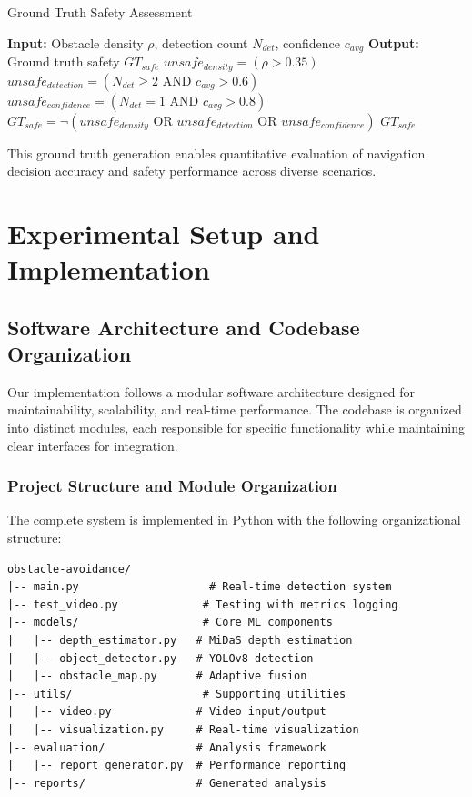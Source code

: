 \documentclass[12pt,oneside]{book}
\begin{document}
\begin{algorithm}
\caption{Ground Truth Safety Assessment}
\begin{algorithmic}
\STATE \textbf{Input:} Obstacle density $\rho$, detection count $N_{det}$, confidence $c_{avg}$
\STATE \textbf{Output:} Ground truth safety $GT_{safe}$
\STATE $unsafe_{density} = (\rho > 0.35)$
\STATE $unsafe_{detection} = (N_{det} \geq 2 \text{ AND } c_{avg} > 0.6)$
\STATE $unsafe_{confidence} = (N_{det} = 1 \text{ AND } c_{avg} > 0.8)$
\STATE $GT_{safe} = \neg(unsafe_{density} \text{ OR } unsafe_{detection} \text{ OR } unsafe_{confidence})$
\RETURN $GT_{safe}$
\end{algorithmic}
\end{algorithm}

This ground truth generation enables quantitative evaluation of navigation decision accuracy and safety performance across diverse scenarios.

\section{Experimental Setup and Implementation}

\subsection{Software Architecture and Codebase Organization}

Our implementation follows a modular software architecture designed for maintainability, scalability, and real-time performance. The codebase is organized into distinct modules, each responsible for specific functionality while maintaining clear interfaces for integration.

\subsubsection{Project Structure and Module Organization}

The complete system is implemented in Python with the following organizational structure:

\begin{verbatim}
obstacle-avoidance/
|-- main.py                    # Real-time detection system
|-- test_video.py             # Testing with metrics logging
|-- models/                   # Core ML components
|   |-- depth_estimator.py   # MiDaS depth estimation
|   |-- object_detector.py   # YOLOv8 detection
|   |-- obstacle_map.py      # Adaptive fusion
|-- utils/                    # Supporting utilities
|   |-- video.py             # Video input/output
|   |-- visualization.py     # Real-time visualization
|-- evaluation/              # Analysis framework
|   |-- report_generator.py  # Performance reporting
|-- reports/                 # Generated analysis
\end{verbatim}
\end{document}
